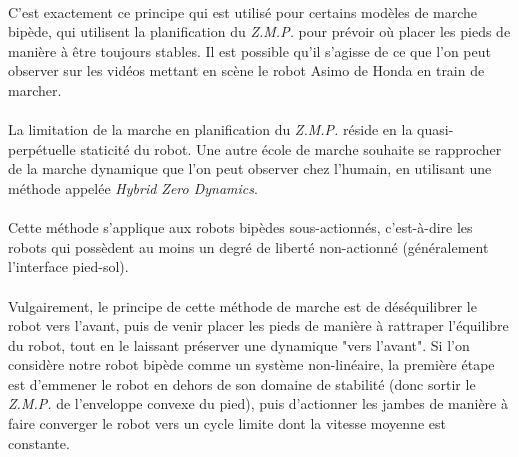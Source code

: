 \documentclass[a4paper,10pt]{article}
\begin{document}
            \paragraph{}
                C'est exactement ce principe qui est utilisé pour certains modèles de marche bipède,
                qui utilisent la planification du \textit{Z.M.P.} pour prévoir où placer les pieds 
                de manière à être toujours stables. Il est possible qu'il s'agisse de ce que l'on peut observer 
                sur les vidéos mettant en scène le robot Asimo de Honda en train de marcher. 
        
            \paragraph{}
                La limitation de la marche en planification du \textit{Z.M.P.} réside en la quasi-perpétuelle
                staticité du robot. Une autre école de marche souhaite se rapprocher de la marche dynamique 
                que l'on peut observer chez l'humain, en utilisant une méthode appelée \textit{Hybrid Zero Dynamics}. 
                
            \paragraph{}
                Cette méthode s'applique aux robots bipèdes sous-actionnés, c'est-à-dire les 
                robots qui possèdent au moins un degré de liberté non-actionné (généralement 
                l'interface pied-sol). 
                
            \paragraph{}
                Vulgairement, le principe de cette méthode de marche est de déséquilibrer le robot vers l'avant, 
                puis de venir placer les pieds de manière à rattraper l'équilibre du robot, tout en le laissant
                préserver une dynamique "vers l'avant". Si l'on considère notre robot bipède comme un système 
                non-linéaire, la première étape est d'emmener le robot en dehors de son domaine de stabilité 
                (donc sortir le \textit{Z.M.P.} de l'enveloppe convexe du pied), puis d'actionner les jambes 
                de manière à faire converger le robot vers un cycle limite dont la vitesse moyenne est constante. 
                
\end{document}

